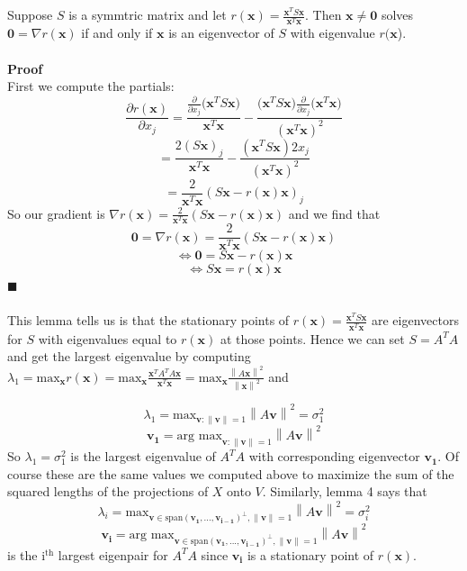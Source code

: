 \documentclass{tufte-handout}
\newcommand{\norm}[1]{\left\lVert#1\right\rVert}
\renewcommand{\qedsymbol}{$\blacksquare$}
\begin{document}
\\\leavevmode\\
\noindent Suppose $S$ is a symmtric matrix and let $r(\mathbf{x})=\frac{\mathbf{x}^TS\mathbf{x}}{\mathbf{x}^T\mathbf{x}}$. Then $\mathbf{x}\neq\mathbf{0}$ solves $\mathbf{0}=\nabla r(\mathbf{x})$ if and only if $\mathbf{x}$ is an eigenvector of $S$ with eigenvalue $r(\mathbf{x}$).\\\leavevmode\\

\noindent \textbf{Proof}\\
\noindent First we compute the partials:
\[
\frac{\partial r(\mathbf{x})}{\partial x_j}
=
\frac{\frac{\partial}{\partial x_j} \Big(\mathbf{x}^TS\mathbf{x}\Big)}{\mathbf{x}^T\mathbf{x}}
-
\frac{\Big(\mathbf{x}^TS\mathbf{x}\Big)\frac{\partial}{\partial x_j}\Big(\mathbf{x}^T\mathbf{x}\Big)}{(\mathbf{x}^T\mathbf{x})^2}
\]
\[
=
\frac{2(S\mathbf{x})_j}{\mathbf{x}^T\mathbf{x}}
-
\frac{(\mathbf{x}^TS\mathbf{x})2x_j}{(\mathbf{x}^T\mathbf{x})^2}
\]
\[
=
\frac{2}{\mathbf{x}^T\mathbf{x}}
(S\mathbf{x}-r(\mathbf{x})\mathbf{x})_j
\]
So our gradient is $\nabla r(\mathbf{x})=\frac{2}{\mathbf{x}^T\mathbf{x}}(S\mathbf{x}-r(\mathbf{x})\mathbf{x})$ and we find that
\[
\mathbf{0}=
\nabla r(\mathbf{x})=\frac{2}{\mathbf{x}^T\mathbf{x}}(S\mathbf{x}-r(\mathbf{x})\mathbf{x})
\]
\[
\iff
\mathbf{0}
=
S\mathbf{x}-r(\mathbf{x})\mathbf{x}
\]
\[
\iff
S\mathbf{x}=r(\mathbf{x})\mathbf{x}
\]
\qedsymbol\\\leavevmode\\

\noindent This lemma tells us is that the stationary points of $r(\mathbf{x})=\frac{\mathbf{x}^TS\mathbf{x}}{\mathbf{x}^T\mathbf{x}}$ are eigenvectors for $S$ with eigenvalues equal to $r(\mathbf{x})$ at those points. Hence we can set $S=A^TA$ and get the largest eigenvalue by computing $\lambda_1=\text{max}_\mathbf{x}r(\mathbf{x})=\text{max}_\mathbf{x}\frac{\mathbf{x}^TA^TA\mathbf{x}}{\mathbf{x}^T\mathbf{x}}=\text{max}_\mathbf{x}\frac{\norm{A\mathbf{x}}^2}{\norm{\mathbf{x}}^2}$ and

\[
\lambda_1=
\text{max}_{\mathbf{v}:\norm{\mathbf{v}}=1}\norm{A\mathbf{v}}^2=\sigma_{1}^2
\]
\[
\mathbf{v_1}=
\text{arg max}_{\mathbf{v}:\norm{\mathbf{v}}=1}\norm{A\mathbf{v}}^2
\]
So $\lambda_1=\sigma_{1}^2$ is the largest eigenvalue of $A^TA$ with corresponding eigenvector $\mathbf{v_1}$. Of course these are the same values we computed above to maximize the sum of the squared lengths of the projections of $X$ onto $V$. Similarly, lemma 4 says that
\[
\lambda_i=
\text{max}_{\mathbf{v}\in\text{span}(\mathbf{v_1},...,\mathbf{v_{i-1}})^\perp,\norm{\mathbf{v}}=1}\norm{A\mathbf{v}}^2=\sigma_{i}^2
\]
\[
\mathbf{v_i}=
\text{arg max}_{\mathbf{v}\in\text{span}(\mathbf{v_1},...,\mathbf{v_{i-1}})^\perp,\norm{\mathbf{v}}=1}\norm{A\mathbf{v}}^2
\]
\noindent is the i$^{\text{th}}$ largest eigenpair for $A^TA$ since $\mathbf{v_i}$ is a stationary point of $r(\mathbf{x})$.\\\leavevmode\\
\end{document}
